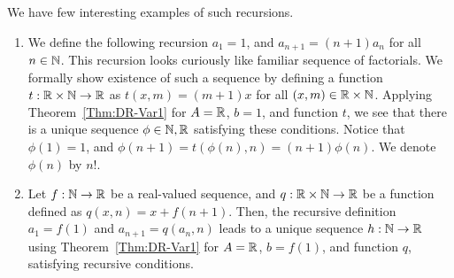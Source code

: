 \documentclass[a4paper,english,12pt]{article}
\begin{document}
\begin{exmp} We have few interesting examples of such recursions.
	\begin{enumerate}
	\item We define the following recursion $a_1 = 1$, and $a_{n+1}=(n + 1)a_n$ for all $n\in \mathbb{N}$. This recursion looks curiously like familiar sequence of factorials. We formally show existence of such a sequence by defining a function $t:\mathbb{R} \times \mathbb{N} \to \mathbb{R}$ as $t(x, m) = (m + 1)x$ for all $(x, m)\in \mathbb{R} \times \mathbb{N}$.  Applying Theorem~\ref{Thm:DR-Var1} for $A = \mathbb{R}$, $b = 1$, and function $t$, we see that there is a unique sequence $\phi \in \mathcal{\mathbb{N}, \mathbb{R}}$ satisfying these conditions. Notice that $\phi(1) = 1$, and $\phi(n+1) = t(\phi(n),n) = (n+1)\phi(n)$. We denote $\phi(n)$ by $n!$.
	\item Let $f : \mathbb{N} \to \mathbb{R}$ be a real-valued sequence, and $q: \mathbb{R} \times \mathbb{N} \to \mathbb{R}$ be a function defined as $q(x,n) = x + f(n+1)$. Then, the recursive definition $a_1 = f(1)$ and $a_{n+1} = q(a_n,n)$ leads to a unique sequence $h: \mathbb{N} \to \mathbb{R}$ using Theorem~\ref{Thm:DR-Var1} for $A = \mathbb{R}$, $b = f(1)$, and function $q$, satisfying recursive conditions.

\end{enumerate}
\end{exmp}
\end{document}
